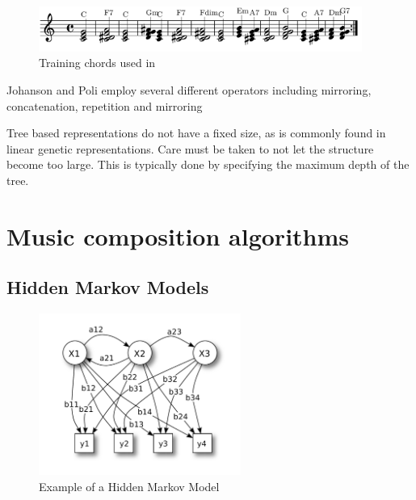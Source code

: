 \begin{figure}
\centerline{\includegraphics[width=400px]{../images/eck_chords_training.png}}
\caption{Training chords used in \cite{Eck2002}}
\label{ims:eckchords}
\end{figure}

Johanson and Poli employ several different operators including mirroring, concatenation, repetition and mirroring \cite{Johanson1998}

Tree based representations do not have a fixed size, as is commonly found in linear genetic representations. Care must be taken to not let the structure become too large. This is typically done by specifying the maximum depth of the tree.


\chapter{Music composition algorithms} \label{chap:comp_algo}

\section{Hidden Markov Models} \label{sec:hmm_backround}

\begin{figure}[ht!]
\center
\includegraphics[width=250px]{../images/HiddenMarkovModel.pdf}
\caption{Example of a Hidden Markov Model}
\label{ims:hmm_example}
\end{figure}




